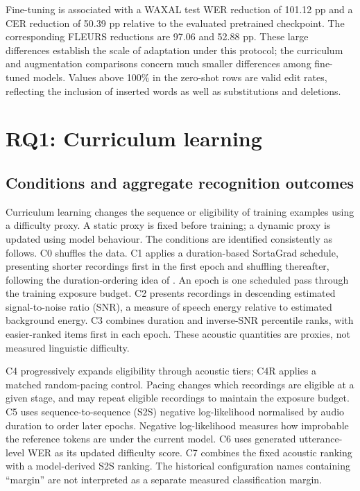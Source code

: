\documentclass[12pt,a4paper]{report}
\begin{document}
Fine-tuning is associated with a WAXAL test WER reduction of 101.12 pp and a CER reduction of 50.39 pp relative to the evaluated pretrained checkpoint. The corresponding FLEURS reductions are 97.06 and 52.88 pp. These large differences establish the scale of adaptation under this protocol; the curriculum and augmentation comparisons concern much smaller differences among fine-tuned models. Values above 100\% in the zero-shot rows are valid edit rates, reflecting the inclusion of inserted words as well as substitutions and deletions.

\section{RQ1: Curriculum learning}
\label{sec:results-rq1}

\subsection{Conditions and aggregate recognition outcomes}

Curriculum learning changes the sequence or eligibility of training examples using a difficulty proxy. A static proxy is fixed before training; a dynamic proxy is updated using model behaviour. The conditions are identified consistently as follows. C0 shuffles the data. C1 applies a duration-based SortaGrad schedule, presenting shorter recordings first in the first epoch and shuffling thereafter, following the duration-ordering idea of \citet{Amodei2016}. An epoch is one scheduled pass through the training exposure budget. C2 presents recordings in descending estimated signal-to-noise ratio (SNR), a measure of speech energy relative to estimated background energy. C3 combines duration and inverse-SNR percentile ranks, with easier-ranked items first in each epoch. These acoustic quantities are proxies, not measured linguistic difficulty.

C4 progressively expands eligibility through acoustic tiers; C4R applies a matched random-pacing control. Pacing changes which recordings are eligible at a given stage, and may repeat eligible recordings to maintain the exposure budget. C5 uses sequence-to-sequence (S2S) negative log-likelihood normalised by audio duration to order later epochs. Negative log-likelihood measures how improbable the reference tokens are under the current model. C6 uses generated utterance-level WER as its updated difficulty score. C7 combines the fixed acoustic ranking with a model-derived S2S ranking. The historical configuration names containing ``margin'' are not interpreted as a separate measured classification margin.
\end{document}
